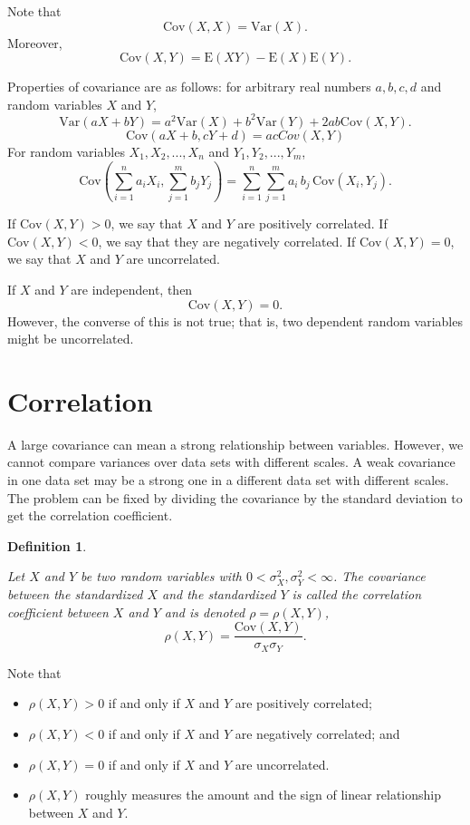 \documentclass[
]{book}
\theoremstyle{definition}
\newtheorem{definition}{Definition}[chapter]
\theoremstyle{definition}
\theoremstyle{definition}
\theoremstyle{definition}
\theoremstyle{remark}
\begin{document}
Note that \[\mathrm{Cov}(X, X) = \mathrm{Var}(X).\] Moreover,
\[\mathrm{Cov}(X,Y) = \mathrm{E}(XY) - \mathrm{E}(X)\mathrm{E}(Y).\]

Properties of covariance are as follows: for arbitrary real numbers
\(a, b, c, d\) and random variables \(X\) and \(Y\),
\[\mathrm{Var}(aX + bY) = a^2 \mathrm{Var}(X) + b^2 \mathrm{Var}(Y) + 2 a b \mathrm{Cov}(X,Y).\]
\[\mathrm{Cov}(aX + b, cY + d) = acCov(X, Y)\] For random variables
\(X_1, X_2, . . . , X_n\) and \(Y_1, Y_2, . . . , Y_m\),
\[\mathrm{Cov}(\sum_{i=1}^n a_i X_i, \sum_{j=1}^m b_j Y_j) = \sum_{i=1}^n\sum_{j=1}^m a_i\,b_j\, \mathrm{Cov}(X_i,Y_j).\]

If \(\mathrm{Cov}(X, Y) > 0\), we say that \(X\) and \(Y\) are positively
correlated. If \(\mathrm{Cov}(X, Y) < 0\), we say that they are negatively
correlated. If \(\mathrm{Cov}(X, Y) = 0\), we say that \(X\) and \(Y\) are
uncorrelated.

If \(X\) and \(Y\) are independent, then \[\mathrm{Cov}(X,Y) = 0.\] However,
the converse of this is not true; that is, two dependent random
variables might be uncorrelated.

\hypertarget{correlation}{%
\section{Correlation}\label{correlation}}

A large covariance can mean a strong relationship between variables.
However, we cannot compare variances over data sets with different
scales. A weak covariance in one data set may be a strong one in a
different data set with different scales. The problem can be fixed by
dividing the covariance by the standard deviation to get the correlation
coefficient.

\begin{definition}
\protect\hypertarget{def:unlabeled-div-26}{}\label{def:unlabeled-div-26}

\emph{Let \(X\) and \(Y\) be two random variables with
\(0< \sigma^2_X, \sigma^2_Y < \infty\). The covariance between the
standardized \(X\) and the standardized \(Y\) is called the correlation
coefficient between \(X\) and \(Y\) and is denoted \(\rho = \rho(X,Y)\),
\[\rho(X,Y) = \frac{\mathrm{Cov}(X,Y)}{\sigma_X \sigma_Y}.\] }

\end{definition}

Note that

\begin{itemize}
\item
  \(\rho(X, Y ) > 0\) if and only if \(X\) and \(Y\) are positively
  correlated;
\item
  \(\rho(X, Y ) < 0\) if and only if \(X\) and \(Y\) are negatively
  correlated; and
\item
  \(\rho(X, Y ) = 0\) if and only if \(X\) and \(Y\) are uncorrelated.
\item
  \(\rho(X, Y )\) roughly measures the amount and the sign of linear
  relationship between \(X\) and \(Y\).
\end{itemize}
\end{document}
